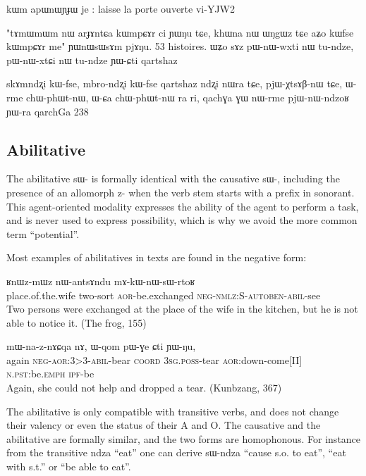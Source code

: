 \documentclass[oldfontcommands,oneside,a4paper,11pt]{memoir}
\newcommand{\ipa}[1]{{\phon #1}} %
\newcommand{\aor}{\textsc{aor}}
\newcommand{\auto}{\textsc{autoben}}
\newcommand{\coord}{\textsc{coord}}
\newcommand{\emphat}{\textsc{emph}}
\newcommand{\ipf}{\textsc{ipf}}
\newcommand{\negat}{\textsc{neg}}
\newcommand{\nmlz}{\textsc{nmlz}}
\newcommand{\npst}{\textsc{n.pst}}
\newcommand{\poss}{\textsc{poss}}
\newcommand{\sg}{\textsc{sg}}
\newcommand{\abil}{\textsc{abil}}
\begin{document}
 kɯm apɯnɯɲɟɯ je : laisse la porte ouverte
 vi-YJW2
 
 
 
"tɤmɯmɯm nɯ arɟɤntɕa kɯmpɕɤr ci ɲɯŋu tɕe, khɯna nɯ ɯŋgɯz tɕe aʑo kɯfse kɯmpɕɤr me" ɲɯnɯsɯsɤm pjɤŋu.
53 histoires. 
 ɯʑo sɤz pɯ-nɯ-wxti nɯ tu-ndze, pɯ-nɯ-xtɕi nɯ tu-ndze ɲɯ-ɕti  
 qartshaz
 
 skɤmndʐi kɯ-fse, mbro-ndʐi kɯ-fse qartshaz ndʐi nɯra tɕe, pjɯ-χtsɤβ-nɯ tɕe,
ɯ-rme chɯ-phɯt-nɯ, ɯ-ɕa chɯ-phɯt-nɯ ra ri, 
qachɣa ɣɯ nɯ-rme pjɯ-nɯ-ndzoʁ ɲɯ-ra
qarchGa 238
 
\subsection{Abilitative} \label{sub:abilitative}
The abilitative \ipa{sɯ-} is formally identical with the causative  \ipa{sɯ-}, including the presence of an allomorph \ipa{z-} when the verb stem starts with a prefix in sonorant. This agent-oriented modality expresses the ability of the agent to perform a task, and is never used to express possibility, which is why we avoid the more common term ``potential''.

Most examples of abilitatives in texts are found in the negative form:

\begin{exe}
\ex 
\gll \ipa{khɤdi} 	\ipa{ʁnɯz-mɯz} 	\ipa{nɯ-antsɤndu} 	\ipa{mɤ-kɯ-nɯ-sɯ-rtoʁ} \\
place.of.the.wife two-sort \aor{}-be.exchanged \negat{}-\nmlz{}:S-\auto{}-\abil{}-see \\
 \glt  Two persons were exchanged at the place of the wife in the kitchen, but he is not able to notice it.  (The frog, 155)
   \end{exe}
   
 \begin{exe}
\ex 
\gll  	\ipa{li} 	\ipa{mɯ-na-z-nɤɕqa} 	\ipa{nɤ,} 	\ipa{ɯ-qom} 	\ipa{pɯ-ɣe} 	\ipa{ɕti} 	\ipa{ɲɯ-ŋu,}  \\
again \negat{}-\aor{}:3>3-\abil{}-bear \coord{} 3\sg{}.\poss{}-tear \aor{}:down-come[II] \npst{}:be.\emphat{} \ipf{}-be \\
 \glt  Again, she could not help and dropped a tear. (Kunbzang, 367)
   \end{exe}
The abilitative is only compatible with transitive verbs, and does not change their valency or even the status of their A and O.  The causative and the abilitative are formally similar, and the two forms are  homophonous. For instance from the transitive \ipa{ndza} ``eat'' one can derive \ipa{sɯ-ndza} ``cause s.o. to eat'', ``eat with s.t.'' or ``be able to eat''. 
\end{document}
